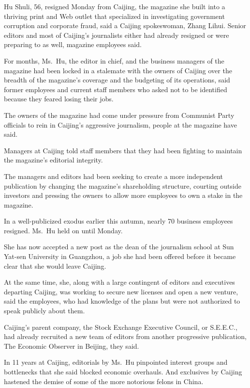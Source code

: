 ﻿\documentclass[12pt]{article}
\begin{document}
Hu Shuli, 56, resigned Monday from Caijing, the magazine she built into a thriving print and Web
outlet that specialized in investigating government corruption and corporate fraud, said a Caijing
spokeswoman, Zhang Lihui. Senior editors and most of Caijing's journalists either had already
resigned or were preparing to as well, magazine employees said.

For months, Ms.~Hu, the editor in chief, and the business managers of the magazine had been locked
in a stalemate with the owners of Caijing over the breadth of the magazine's coverage and the
budgeting of its operations, said former employees and current staff members who asked not to be
identified because they feared losing their jobs.

The owners of the magazine had come under pressure from Communist Party officials to rein in
Caijing's aggressive journalism, people at the magazine have said.

Managers at Caijing told staff members that they had been fighting to maintain the magazine's
editorial integrity.

The managers and editors had been seeking to create a more independent publication by changing the
magazine's shareholding structure, courting outside investors and pressing the owners to allow more
employees to own a stake in the magazine.

In a well-publicized exodus earlier this autumn, nearly 70 business employees resigned. Ms.~Hu held
on until Monday.

She has now accepted a new post as the dean of the journalism school at Sun Yat-sen University in
Guangzhou, a job she had been offered before it became clear that she would leave Caijing.

At the same time, she, along with a large contingent of editors and executives departing Caijing,
was working to secure new licenses and open a new venture, said the employees, who had knowledge of
the plans but were not authorized to speak publicly about them.

Caijing's parent company, the Stock Exchange Executive Council, or S.E.E.C., had already recruited a
new team of editors from another progressive publication, The Economic Observer in Beijing, they
said.

In 11 years at Caijing, editorials by Ms.~Hu pinpointed interest groups and bottlenecks that she
said blocked economic overhauls. And exclusives by Caijing hastened the demise of some of the more
notorious felons in China.
\end{document}

